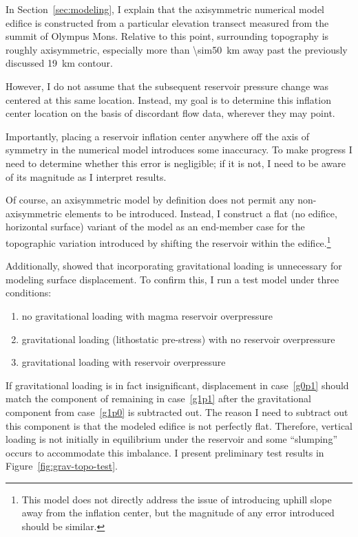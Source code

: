 
In Section~\ref{sec:modeling}, I explain that the axisymmetric numerical model edifice is constructed from a particular elevation transect measured from the summit of Olympus Mons. Relative to this point, surrounding topography is roughly axisymmetric, especially more than \qty{\sim50}{\km} away past the previously discussed \qty{19}{\km} contour.

However, I do not assume that the subsequent reservoir pressure change was centered at this same location. Instead, my goal is to  determine this inflation center location on the basis of discordant flow data, wherever they may point.

Importantly, placing a reservoir inflation center anywhere off the axis of symmetry in the numerical model introduces some inaccuracy. To make progress I need to determine whether this error is negligible; if it is not, I need to be aware of its magnitude as I interpret results.

Of course, an axisymmetric model by definition does not permit any non-axisymmetric elements to be introduced. Instead, I construct a flat (no edifice, horizontal surface) variant of the model as an end-member case for the topographic variation introduced by shifting the reservoir within the edifice.\footnote{This model does not directly address the issue of introducing uphill slope away from the inflation center, but the magnitude of any error introduced should be similar.}

Additionally, \textcite{grosfils_magma_2007} showed that incorporating gravitational loading is unnecessary for modeling surface displacement. To confirm this, I run a test model under three conditions:
\begin{enumerate}
    \item no gravitational loading with magma reservoir overpressure \label{g0p1}
    \item gravitational loading (lithostatic pre-stress) with no reservoir overpressure\label{g1p0}
    \item gravitational loading with reservoir overpressure \label{g1p1}
\end{enumerate}
If gravitational loading is in fact insignificant, displacement in case~\ref{g0p1} should match the component of remaining in case~\ref{g1p1} after the gravitational component from case~\ref{g1p0} is subtracted out. The reason I need to subtract out this component is that the modeled edifice is not perfectly flat. Therefore, vertical loading is not initially in equilibrium under the reservoir and some ``slumping'' occurs to accommodate this imbalance. I present preliminary test results in Figure~\ref{fig:grav-topo-test}.


